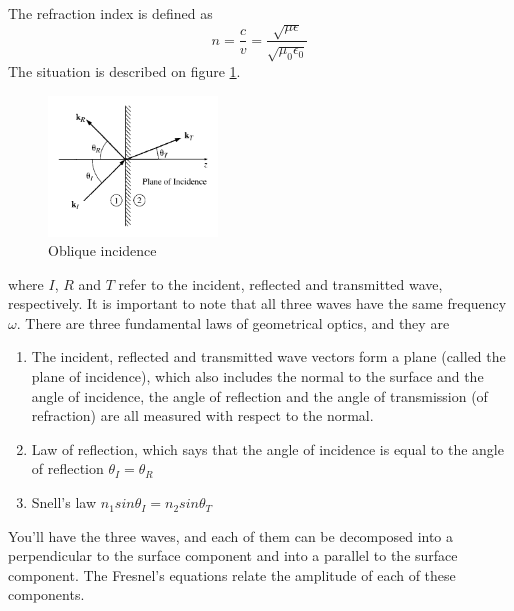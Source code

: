 \documentclass[oneside, 10pt, notitlepage]{book}
\begin{document}
The refraction index is defined as
\begin{equation}
    n = \frac{c}{v} = \frac{\sqrt{\mu \epsilon}}{\sqrt{\mu_ 0 \epsilon_0}}
\end{equation}
The situation is described on figure \ref{fig:obliqueincidence}.
\begin{figure}[H]
    \centering
    \includegraphics[width=0.4\textwidth]{griffithselectro9-14}
    \caption{Oblique incidence}
    \label{fig:obliqueincidence}
\end{figure}
where \(I\), \(R\) and \(T\) refer to the incident, reflected and transmitted wave, respectively. It is important to note that all three waves have the same frequency \(\omega\).
There are three fundamental laws of geometrical optics, and they are
\begin{enumerate}
    \item The incident, reflected and transmitted wave vectors form a plane (called the plane of incidence), which also includes the normal to the surface and the angle of incidence, the angle of reflection and the angle of transmission (of refraction) are all measured with respect to the normal.
    \item Law of reflection, which says that the angle of incidence is equal to the angle of reflection
    \(\theta_I = \theta_R\)
    \item Snell's law 
    \(n_1 sin\theta_I = n_2 sin\theta_T\)
\end{enumerate}
You'll have the three waves, and each of them can be decomposed into a perpendicular to the surface component and into a parallel to the surface component. The Fresnel's equations relate the amplitude of each of these components.
\end{document}
